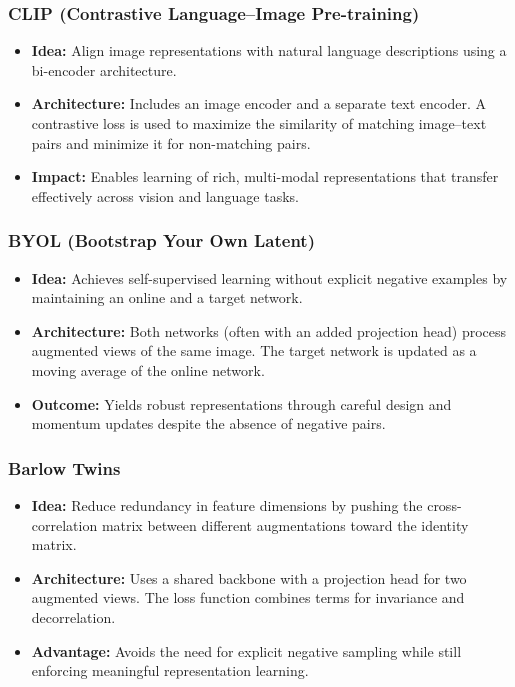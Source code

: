 \documentclass{article}
\begin{document}
\subsubsection{CLIP (Contrastive Language–Image Pre-training)}
\begin{itemize}
    \item \textbf{Idea:} Align image representations with natural language descriptions using a bi-encoder architecture.
    \item \textbf{Architecture:} Includes an image encoder and a separate text encoder. A contrastive loss is used to maximize the similarity of matching image--text pairs and minimize it for non-matching pairs.
    \item \textbf{Impact:} Enables learning of rich, multi-modal representations that transfer effectively across vision and language tasks.
\end{itemize}

\subsubsection{BYOL (Bootstrap Your Own Latent)}
\begin{itemize}
    \item \textbf{Idea:} Achieves self-supervised learning without explicit negative examples by maintaining an online and a target network.
    \item \textbf{Architecture:} Both networks (often with an added projection head) process augmented views of the same image. The target network is updated as a moving average of the online network.
    \item \textbf{Outcome:} Yields robust representations through careful design and momentum updates despite the absence of negative pairs.
\end{itemize}

\subsubsection{Barlow Twins}
\begin{itemize}
    \item \textbf{Idea:} Reduce redundancy in feature dimensions by pushing the cross-correlation matrix between different augmentations toward the identity matrix.
    \item \textbf{Architecture:} Uses a shared backbone with a projection head for two augmented views. The loss function combines terms for invariance and decorrelation.
    \item \textbf{Advantage:} Avoids the need for explicit negative sampling while still enforcing meaningful representation learning.
\end{itemize}
\end{document}
